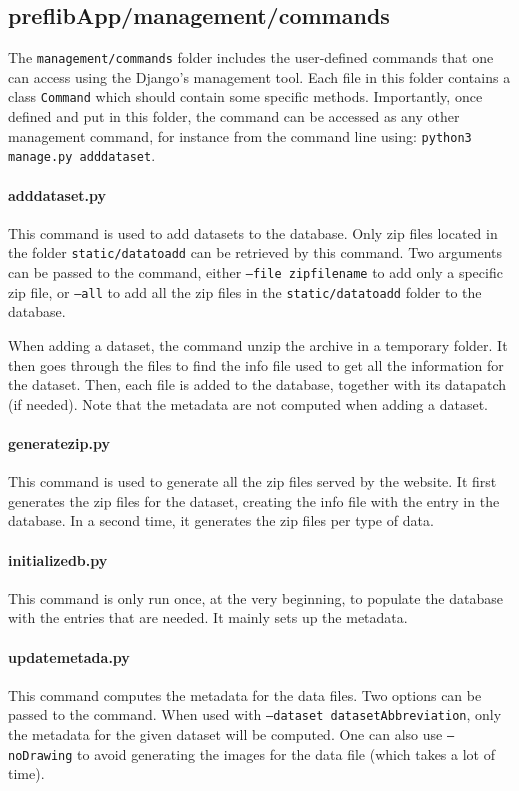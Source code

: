\documentclass{report}
\begin{document}
	\subsection*{\faFolderO{} preflibApp/management/commands}
	
	The \texttt{management/commands} folder includes the user-defined commands that one can access using the Django's management tool. Each file in this folder contains a class \texttt{Command} which should contain some specific methods. Importantly, once defined and put in this folder, the command can be accessed as any other management command, for instance from the command line using: \texttt{python3 manage.py adddataset}.
	
	\paragraph*{\faFileO{} adddataset.py} This command is used to add datasets to the database. Only zip files located in the folder \texttt{static/datatoadd} can be retrieved by this command. Two arguments can be passed to the command, either \texttt{--file zipfilename} to add only a specific zip file, or \texttt{--all} to add all the zip files in the \texttt{static/datatoadd} folder to the database.
	
	When adding a dataset, the command unzip the archive in a temporary folder. It then goes through the files to find the info file used to get all the information for the dataset. Then, each file is added to the database, together with its datapatch (if needed). Note that the metadata are not computed when adding a dataset. 
	
	\paragraph*{\faFileO{} generatezip.py} This command is used to generate all the zip files served by the website. It first generates the zip files for the dataset, creating the info file with the entry in the database. In a second time, it generates the zip files per type of data.
	
	\paragraph*{\faFileO{} initializedb.py} This command is only run once, at the very beginning, to populate the database with the entries that are needed. It mainly sets up the metadata.
	
	\paragraph*{\faFileO{} updatemetada.py} This command computes the metadata for the data files. Two options can be passed to the command. When used with \texttt{--dataset datasetAbbreviation}, only the metadata for the given dataset will be computed. One can also use \texttt{--noDrawing} to avoid generating the images for the data file (which takes a lot of time).
	
\end{document}
